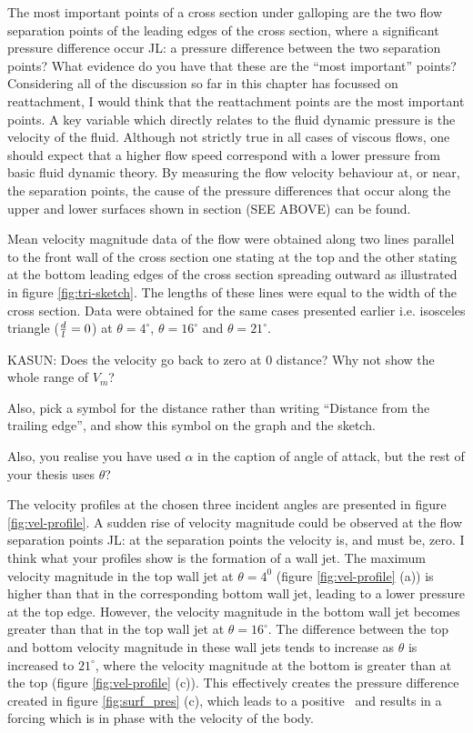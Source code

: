 The most important points of a cross section under galloping are the two flow separation points of the leading edges of the cross section, where a significant pressure difference occur JL: a pressure difference between the two separation points? What evidence do you have that these are the ``most important'' points? Considering all of the discussion so far in this chapter has focussed on reattachment, I would think that the reattachment points are the most important points. A key variable which directly relates to the fluid dynamic pressure is the velocity of the fluid. Although not strictly true in all cases of viscous flows, one should expect that a higher flow speed correspond with a lower pressure from basic fluid dynamic theory. By measuring the flow velocity behaviour at, or near, the separation points, the cause of the pressure differences that occur along the upper and lower surfaces shown in section (SEE ABOVE) can be found.


   
Mean velocity magnitude data of the flow were obtained along two lines parallel to the front wall of the cross section one stating at the top and the other stating at the bottom leading edges of the cross section spreading outward as illustrated in figure \ref{fig:tri-sketch}. The lengths of these lines were equal to the width of the cross section. Data were obtained for the same cases presented earlier i.e. isosceles triangle ($\frac{d}{l}=0$) at $\theta=4^{\circ}$, $\theta=16^{\circ}$ and $\theta=21^{\circ}$.
       


KASUN: Does the velocity go back to zero at 0 distance? Why not show
the whole range of $V_m$?

Also, pick a symbol for the distance rather than writing ``Distance
from the trailing edge'', and show this symbol on the graph and the
sketch.

Also, you realise you have used $\alpha$ in the caption of angle of
attack, but the rest of your thesis uses $\theta$?

The velocity profiles at the chosen three incident angles are presented in figure \ref{fig:vel-profile}. A sudden rise of velocity magnitude could be observed at the flow separation points JL: at the separation points the velocity is, and must be, zero. I think what your profiles show is the formation of a wall jet. The maximum velocity magnitude in the top wall jet at $\theta= 4^{0}$ (figure \ref{fig:vel-profile} (a)) is higher than that in the corresponding bottom wall jet, leading to a lower pressure at the top edge. However, the velocity magnitude in the bottom wall jet becomes greater than that in the top wall jet at $\theta=16^{\circ}$. The difference between the top and bottom velocity magnitude in these wall jets tends to increase as $\theta$ is increased to $21^{\circ}$, where the velocity magnitude at the bottom is greater than at the top (figure \ref{fig:vel-profile} (c)). This effectively creates the pressure difference created in figure \ref{fig:surf_pres} (c), which leads to a positive \cy\ and results in a forcing which is in phase with the velocity of the body. 


